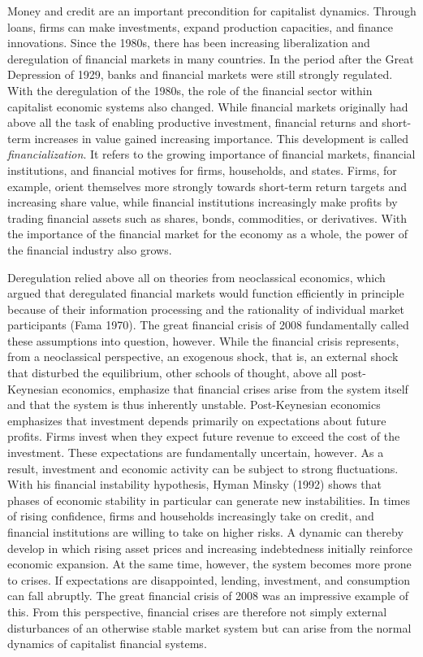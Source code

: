 \documentclass[
  british,
  a4paper,
  DIV=11,
  numbers=noendperiod,
  oneside,
  openany]{scrreprt}
\begin{document}
Money and credit are an important precondition for capitalist dynamics.
Through loans, firms can make investments, expand production capacities,
and finance innovations. Since the 1980s, there has been increasing
liberalization and deregulation of financial markets in many countries.
In the period after the Great Depression of 1929, banks and financial
markets were still strongly regulated. With the deregulation of the
1980s, the role of the financial sector within capitalist economic
systems also changed. While financial markets originally had above all
the task of enabling productive investment, financial returns and
short-term increases in value gained increasing importance. This
development is called \emph{financialization}. It refers to the growing
importance of financial markets, financial institutions, and financial
motives for firms, households, and states. Firms, for example, orient
themselves more strongly towards short-term return targets and
increasing share value, while financial institutions increasingly make
profits by trading financial assets such as shares, bonds, commodities,
or derivatives. With the importance of the financial market for the
economy as a whole, the power of the financial industry also grows.

Deregulation relied above all on theories from neoclassical economics,
which argued that deregulated financial markets would function
efficiently in principle because of their information processing and the
rationality of individual market participants (Fama 1970). The great
financial crisis of 2008 fundamentally called these assumptions into
question, however. While the financial crisis represents, from a
neoclassical perspective, an exogenous shock, that is, an external shock
that disturbed the equilibrium, other schools of thought, above all
post-Keynesian economics, emphasize that financial crises arise from the
system itself and that the system is thus inherently unstable.
Post-Keynesian economics emphasizes that investment depends primarily on
expectations about future profits. Firms invest when they expect future
revenue to exceed the cost of the investment. These expectations are
fundamentally uncertain, however. As a result, investment and economic
activity can be subject to strong fluctuations. With his financial
instability hypothesis, Hyman Minsky (1992) shows that phases of
economic stability in particular can generate new instabilities. In
times of rising confidence, firms and households increasingly take on
credit, and financial institutions are willing to take on higher risks.
A dynamic can thereby develop in which rising asset prices and
increasing indebtedness initially reinforce economic expansion. At the
same time, however, the system becomes more prone to crises. If
expectations are disappointed, lending, investment, and consumption can
fall abruptly. The great financial crisis of 2008 was an impressive
example of this. From this perspective, financial crises are therefore
not simply external disturbances of an otherwise stable market system
but can arise from the normal dynamics of capitalist financial systems.
\end{document}
